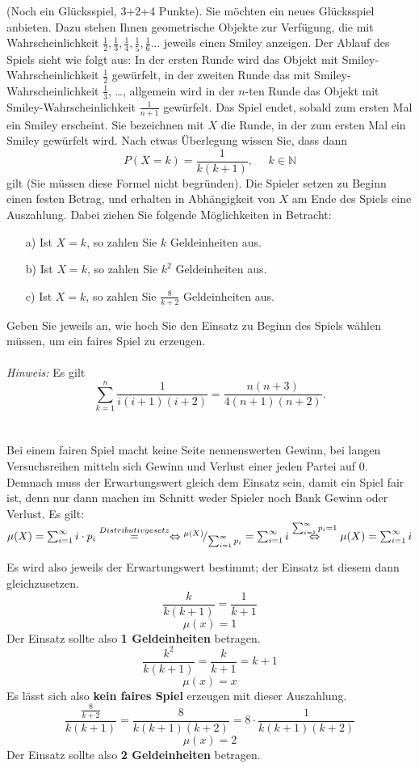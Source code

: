 \documentclass[twoside]{article}
\begin{document}
(Noch ein Glücksspiel, 3+2+4 Punkte).
Sie möchten ein neues Glücksspiel anbieten.
Dazu stehen Ihnen geometrische Objekte zur Verfügung, die mit Wahrscheinlichkeit $\frac{1}{2},\frac{1}{3},\frac{1}{4},\frac{1}{5},\frac{1}{6}\dots$ jeweils einen Smiley anzeigen.
Der Ablauf des Spiels sieht wie folgt aus: In der ersten Runde wird das Objekt mit Smiley-Wahrscheinlichkeit $\frac{1}{2}$ gewürfelt, in der zweiten Runde das mit Smiley-Wahrscheinlichkeit $\frac{1}{3}$, \dots, allgemein wird in der $n$-ten Runde das Objekt mit Smiley-Wahrscheinlichkeit $\frac{1}{n+1}$ gewürfelt.
Das Spiel endet, sobald zum ersten Mal ein Smiley erscheint.
Sie bezeichnen mit $X$ die Runde, in der zum ersten Mal ein Smiley gewürfelt wird.
Nach etwas Überlegung wissen Sie, dass dann
\[
	P(X=k)=\frac{1}{k(k+1)},~~~~~~k \in \mathbb{N}
\]
gilt (Sie müssen diese Formel nicht begründen).
Die Spieler setzen zu Beginn einen festen Betrag, und erhalten in Abhängigkeit von $X$ am Ende des Spiels eine Auszahlung.
Dabei ziehen Sie folgende Möglichkeiten in Betracht:
\begin{enumerate}
	\item[a)] Ist $X=k$, so zahlen Sie $k$ Geldeinheiten aus.
	\item[b)] Ist $X=k$, so zahlen Sie $k^2$ Geldeinheiten aus.
	\item[c)] Ist $X=k$, so zahlen Sie $\frac{8}{k+2}$ Geldeinheiten aus.
\end{enumerate} 
Geben Sie jeweils an, wie hoch Sie den Einsatz zu Beginn des Spiels wählen müssen, um ein faires Spiel zu erzeugen.\\
\vspace{.2cm}\\
\textit{Hinweis:} Es gilt
\[
	\sum_{k=1}^{n}\frac{1}{i(i+1)(i+2)}=\frac{n(n+3)}{4(n+1)(n+2)}.
\]
\-\\\vspace{.3cm}\\
Bei einem fairen Spiel macht keine Seite nennenswerten Gewinn, bei langen Versuchsreihen mitteln sich Gewinn und Verlust einer jeden Partei auf 0.
Demnach muss der Erwartungswert gleich dem Einsatz sein, damit ein Spiel fair ist, denn nur dann machen im Schnitt weder Spieler noch Bank Gewinn oder Verlust.
Es gilt: $\mu(X) = \sum_{i= 1}^{\infty}i\cdot p_i \overset{Distributivgesetz}{=}\Leftrightarrow {}^{\mu(X)}\!/_{\sum_{i= 1}^{\infty}p_i} = \sum_{i= 1}^{\infty}i \overset{\sum_{i= 1}^{\infty}p_i=1}{\Leftrightarrow} \mu(X) = \sum_{i= 1}^{\infty}i$

Es wird also jeweils der Erwartungswert bestimmt; der Einsatz ist diesem dann gleichzusetzen.
\[
	\frac{k}{k(k+1)}=\frac{1}{k+1}
\]
\[
	\mu(x)=1
\]
Der Einsatz sollte also \textbf{1 Geldeinheiten} betragen.
\[
	\frac{k^2}{k(k+1)}=\frac{k}{k+1}=k+1
\]
\[
	\mu(x)=x
\]
Es lässt sich also \textbf{kein faires Spiel} erzeugen mit dieser Auszahlung.
\[
	\frac{\frac{8}{k+2}}{k(k+1)}=\frac{8}{k(k+1)(k+2)}=8\cdot\frac{1}{k(k+1)(k+2)}
\]
\[
	\mu(x)=2
\]
Der Einsatz sollte also \textbf{2 Geldeinheiten} betragen.
\fi
\end{document}
